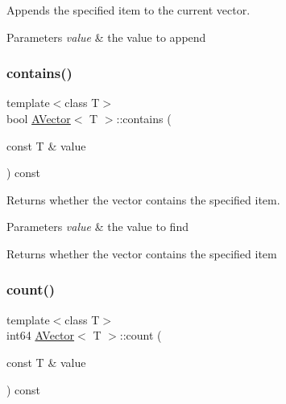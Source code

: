 Appends the specified item to the current vector. 


\begin{DoxyParams}{Parameters}
{\em value} & the value to append \\
\hline
\end{DoxyParams}
\mbox{\label{class_a_vector_ab49821902c6048beab9de0e355baa386}} 
\subsubsection{\texorpdfstring{contains()}{contains()}}
{\footnotesize\ttfamily template$<$class T$>$ \\
bool \mbox{\hyperlink{class_a_vector}{A\+Vector}}$<$ T $>$\+::contains (\begin{DoxyParamCaption}\item[{const T \&}]{value }\end{DoxyParamCaption}) const\hspace{0.3cm}{\ttfamily [inline]}}



Returns whether the vector contains the specified item. 


\begin{DoxyParams}{Parameters}
{\em value} & the value to find \\
\hline
\end{DoxyParams}
\begin{DoxyReturn}{Returns}
whether the vector contains the specified item 
\end{DoxyReturn}
\mbox{\label{class_a_vector_a4a5f14de563e7882f8c856d308f95a96}} 
\subsubsection{\texorpdfstring{count()}{count()}}
{\footnotesize\ttfamily template$<$class T$>$ \\
int64 \mbox{\hyperlink{class_a_vector}{A\+Vector}}$<$ T $>$\+::count (\begin{DoxyParamCaption}\item[{const T \&}]{value }\end{DoxyParamCaption}) const}



